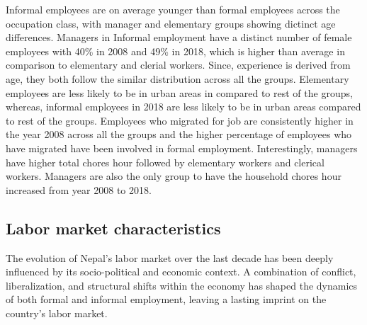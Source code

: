 Informal employees are on average younger than formal employees across the occupation class, with manager and elementary groups showing dictinct age differences. Managers in Informal employment have a distinct number of female employees with 40\% in 2008 and 49\% in 2018, which is higher than average in comparison to elementary and clerial workers. Since, experience is derived from age, they both follow the similar distribution across all the groups. Elementary employees are less likely to be in urban areas in compared to rest of the groups, whereas, informal employees in 2018 are less likely to be in urban areas compared to rest of the groups. Employees who migrated for job are consistently higher in the year 2008 across all the groups and the higher percentage of employees who have migrated have been involved in formal employment. Interestingly, managers have higher total chores hour followed by elementary workers and clerical workers. Managers are also the only group to  have the household chores hour increased from year 2008 to 2018. 




\subsection{Labor market characteristics}
The evolution of Nepal's labor market over the last decade has been deeply influenced by its socio-political and economic context. A combination of conflict, liberalization, and structural shifts within the economy has shaped the dynamics of both formal and informal employment, leaving a lasting imprint on the country's labor market. 

